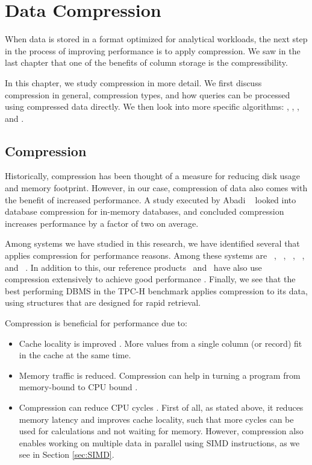 \chapter{Data Compression}
\label{chap:Data Compression}
When data is stored in a format optimized for analytical workloads, the next step in the process of improving performance is to apply compression. We saw in the last chapter that one of the benefits of column storage is the compressibility. 

In this chapter, we study compression in more detail. We first discuss compression in general, compression types, and how queries can be processed using compressed data directly. We then look into more specific algorithms: \bp, \de, \dele, and \rle.

\newpage

\section{Compression}
\label{sec:Compression}
Historically, compression has been thought of a measure for reducing disk usage and memory footprint. However, in our case, compression of data also comes with the benefit of increased performance. A study executed by Abadi \ea~\cite{Abadi2008-dd} looked into database compression for in-memory databases, and concluded compression increases performance by a factor of two on average.

Among systems we have studied in this research, we have identified several that applies compression for performance reasons. Among these systems are \ibm~\cite{Raman2013-em}, \cstore~\cite{Stonebraker2005-qz}, \vertica~\cite{Lamb2012-kg}, \oracle~\cite{Oracle2015-fs}, and \gorilla~\cite{Pelkonen2015-ko}. In addition to this, our reference products \tableau~and \qlikview~have also use compression extensively to achieve good performance \cite{Kamkolkar2015-iq, Qlik2014-vd}. Finally, we see that the best performing DBMS in the TPC-H benchmark applies compression to its data, using structures that are designed for rapid retrieval.

Compression is beneficial for performance due to:
\begin{itemize}
  \item Cache locality is improved \cite{Exasol2014-xh}. More values from a single column (or record) fit in the cache at the same time.
  \item Memory traffic is reduced. Compression can help in turning a program from memory-bound to CPU bound \cite{Willhalm2009-hu}.
  \item Compression can reduce CPU cycles \cite{Stonebraker2005-qz}. First of all, as stated above, it reduces memory latency and improves cache locality, such that more cycles can be used for calculations and not waiting for memory. However, compression also enables working on multiple data in parallel using SIMD instructions, as we see in Section \ref{sec:SIMD}.
\end{itemize}

